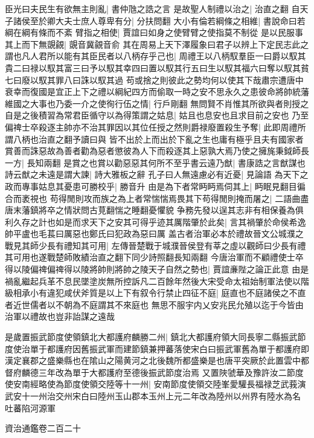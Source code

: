 臣光曰夫民生有欲無主則亂|{
	書仲虺之誥之言}
是故聖人制禮以治之|{
	治直之翻}
自天子諸侯至於卿大夫士庶人尊卑有分|{
	分扶問翻}
大小有倫若綱條之相維|{
	書說命曰若綱在綱有條而不紊}
臂指之相使|{
	賈誼曰如身之使臂臂之使指莫不制從}
是以民服事其上而下無覬覦|{
	覬音冀覦音俞}
其在周易上天下澤履象曰君子以辨上下定民志此之謂也凡人君所以能有其臣民者以八柄存乎己也|{
	周禮王以八柄馭羣臣一曰爵以馭其貴二曰禄以馭其富三曰予以馭其幸四曰置以馭其行五曰生以馭其福六曰奪以馭其貧七曰廢以馭其罪八曰誅以馭其過}
苟或捨之則彼此之勢均何以使其下哉肅宗遭唐中衰幸而復國是宜正上下之禮以綱紀四方而偷取一時之安不思永久之患彼命將帥統藩維國之大事也乃委一介之使徇行伍之情|{
	行戶剛翻}
無問賢不肖惟其所欲與者則授之自是之後積習為常君臣循守以為得策謂之姑息|{
	姑且也息安也且求目前之安也}
乃至偏禆士卒殺逐主帥亦不治其罪因以其位任授之然則爵禄廢置殺生予奪|{
	此即周禮所謂八柄也治直之翻予讀曰與}
皆不出於上而出於下亂之生也庸有極乎且夫有國家者賞善而誅惡故為善者勸為惡者懲彼為人下而殺逐其上惡孰大焉乃使之擁旄秉鉞師長一方|{
	長知兩翻}
是賞之也賞以勸惡惡其何所不至乎書云遠乃猷|{
	書康誥之言猷謀也}
詩云猷之未遠是謂大諫|{
	詩大雅板之辭}
孔子曰人無遠慮必有近憂|{
	見論語}
為天下之政而專事姑息其憂患可勝校乎|{
	勝音升}
由是為下者常眄眄焉伺其上|{
	眄眠見翻目徧合而袤視也}
苟得閒則攻而族之為上者常惴惴焉畏其下苟得閒則掩而屠之|{
	二語曲盡唐末藩鎮將卒之情狀問古莧翻惴之睡翻憂懼貌}
争務先發以逞其志非有相保養為俱利久存之計也如是而求天下之安其可得乎迹其厲階肇於此矣|{
	言其禍肇於命侯希逸帥平盧也毛萇曰厲惡也鄭氏曰犯政為惡曰厲}
盖古者治軍必本於禮故晉文公城濮之戰見其師少長有禮知其可用|{
	左傳晉楚戰于城濮晉侯登有莘之虛以觀師曰少長有禮其可用也遂戰楚師敗績治直之翻下同少詩照翻長知兩翻}
今唐治軍而不顧禮使士卒得以陵偏禆偏禆得以陵將帥則將帥之陵天子自然之勢也|{
	賈誼亷陛之論正此意}
由是禍亂繼起兵革不息民墜塗炭無所控訴凡二百餘年然後大宋受命太祖始制軍法使以階級相承小有違犯咸伏斧質是以上下有叙令行禁止四征不庭|{
	庭直也不庭諸侯之不直者近世儒者以不朝為不庭謂其不來庭也}
無思不服宇内乂安兆民允殖以迄于今皆由治軍以禮故也豈非詒謀之遠哉

是歲置振武節度使領鎮北大都護府麟勝二州|{
	鎮北大都護府領大同長寧二縣振武節度使治單于都護府因舊振武軍而建節鎮兼押蕃落使宋白曰振武軍舊為單于都護府即漢定襄郡之盛樂縣也在隂山之陽黄河之北後魏所都盛樂是也唐平突厥於此置雲中都督府麟德三年改為單于大都護府至德後振武節度治焉}
又置陜虢華及豫許汝二節度使安南經略使為節度使領交陸等十一州|{
	安南節度使領交陸峯愛驩長福禄芝武莪演武安十一州治交州宋白曰陸州玉山郡本玉州上元二年改為陸州以州界有陸水為名}
吐蕃陷河源軍

資治通鑑卷二百二十
